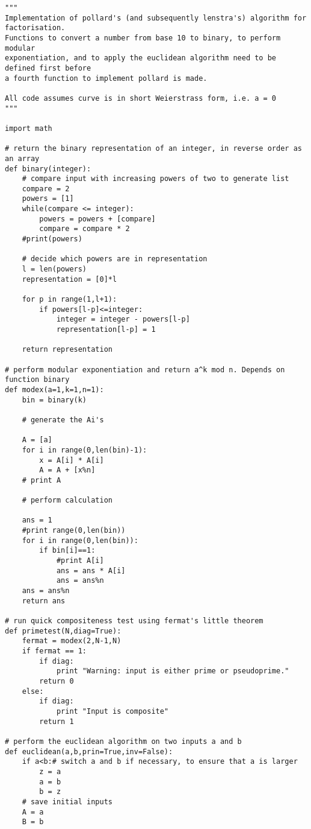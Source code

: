 \begin{verbatim}
"""
Implementation of pollard's (and subsequently lenstra's) algorithm for factorisation.
Functions to convert a number from base 10 to binary, to perform modular
exponentiation, and to apply the euclidean algorithm need to be defined first before
a fourth function to implement pollard is made.

All code assumes curve is in short Weierstrass form, i.e. a = 0
"""

import math

# return the binary representation of an integer, in reverse order as an array
def binary(integer):
    # compare input with increasing powers of two to generate list
    compare = 2
    powers = [1]
    while(compare <= integer):
        powers = powers + [compare]
        compare = compare * 2
    #print(powers)

    # decide which powers are in representation
    l = len(powers)
    representation = [0]*l

    for p in range(1,l+1):
        if powers[l-p]<=integer:
            integer = integer - powers[l-p]
            representation[l-p] = 1

    return representation

# perform modular exponentiation and return a^k mod n. Depends on function binary
def modex(a=1,k=1,n=1):
    bin = binary(k)

    # generate the Ai's

    A = [a]
    for i in range(0,len(bin)-1):
        x = A[i] * A[i]
        A = A + [x%n]
    # print A

    # perform calculation

    ans = 1
    #print range(0,len(bin))
    for i in range(0,len(bin)):
        if bin[i]==1:
            #print A[i]
            ans = ans * A[i]
            ans = ans%n
    ans = ans%n
    return ans

# run quick compositeness test using fermat's little theorem
def primetest(N,diag=True):
    fermat = modex(2,N-1,N)
    if fermat == 1:
        if diag:
            print "Warning: input is either prime or pseudoprime."
        return 0
    else:
        if diag:
            print "Input is composite"
        return 1

# perform the euclidean algorithm on two inputs a and b
def euclidean(a,b,prin=True,inv=False):
    if a<b:# switch a and b if necessary, to ensure that a is larger
        z = a
        a = b
        b = z
    # save initial inputs
    A = a
    B = b


\end{verbatim}
